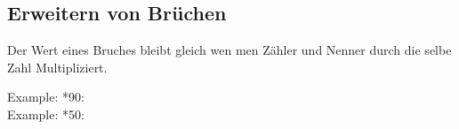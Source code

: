 \subsection{Erweitern von Brüchen}

Der Wert eines Bruches bleibt gleich wen men Zähler und Nenner durch die selbe Zahl Multipliziert.

\hfill \break
Example: *90:
\fboxrule=0.8pt \\
Example: *50:
\fboxrule=0.8pt 
